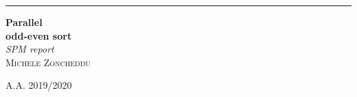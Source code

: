 \documentclass[a4paper, 12pt]{article}
\begin{document}
\begin{titlepage}
	\raggedleft
	\rule{1pt}{\textheight}
	\hspace{0.05\textwidth} 
	\parbox[b]{0.85\textwidth}{
		
		{\Huge\bfseries Parallel \\[0.5\baselineskip] odd-even sort}\\[2\baselineskip]
		{\large\textit{SPM report}}\\[4\baselineskip]
		{\large\textsc{Michele Zoncheddu}}
		
		\vspace{0.5\textheight}
		
		{\noindent A.A. 2019/2020}\\[\baselineskip]
	}
\end{titlepage}



	\sloppy

	
	
	\clearpage
	
\end{document}
